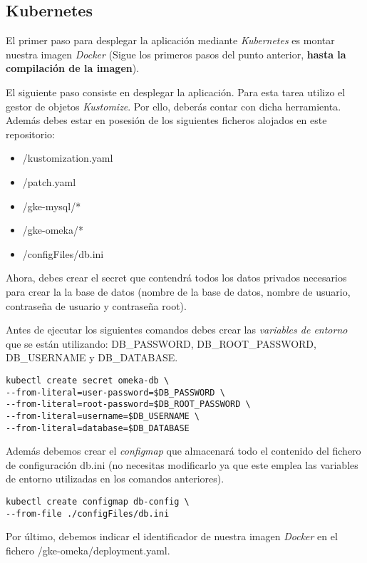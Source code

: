 \subsection{Kubernetes}

El primer paso para desplegar la aplicación mediante \emph{Kubernetes}
es montar nuestra imagen \emph{Docker} (Sigue los primeros pasos del
punto anterior, \textbf{hasta la compilación de la imagen}).

El siguiente paso consiste en desplegar la aplicación. Para esta tarea
utilizo el gestor de objetos \emph{Kustomize}. Por ello, deberás contar
con dicha herramienta. Además debes estar en posesión de los siguientes
ficheros alojados en este repositorio:

\begin{itemize}
\tightlist
\item
  /kustomization.yaml
\item
  /patch.yaml
\item
  /gke-mysql/*
\item
  /gke-omeka/*
\item
  /configFiles/db.ini
\end{itemize}

Ahora, debes crear el {secret} que contendrá todos los datos privados
necesarios para crear la la base de datos (nombre de la base de datos,
nombre de usuario, contraseña de usuario y contraseña root).

Antes de ejecutar los siguientes comandos debes crear las
\emph{variables de entorno} que se están utilizando: DB\_PASSWORD,
DB\_ROOT\_PASSWORD, DB\_USERNAME y DB\_DATABASE.

\begin{verbatim}
kubectl create secret omeka-db \
--from-literal=user-password=$DB_PASSWORD \
--from-literal=root-password=$DB_ROOT_PASSWORD \
--from-literal=username=$DB_USERNAME \
--from-literal=database=$DB_DATABASE
\end{verbatim}

Además debemos crear el \emph{configmap} que almacenará todo el
contenido del fichero de configuración {db.ini} (no necesitas
modificarlo ya que este emplea las variables de entorno utilizadas en
los comandos anteriores).

\begin{verbatim}
kubectl create configmap db-config \
--from-file ./configFiles/db.ini
\end{verbatim}

Por último, debemos indicar el identificador de nuestra imagen
\emph{Docker} en el fichero {/gke-omeka/deployment.yaml}.

